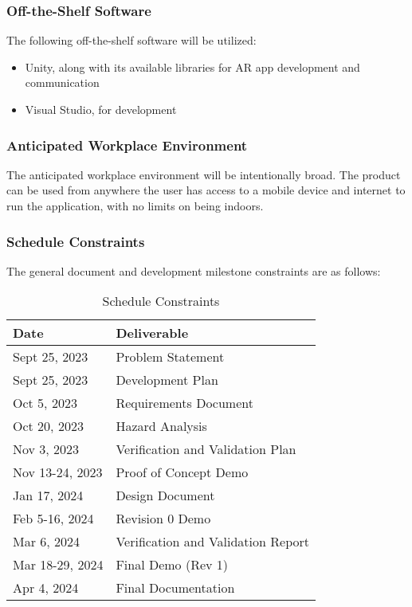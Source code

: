 \documentclass[12pt]{article}
\begin{document}
\subsubsection{Off-the-Shelf Software}
The following off-the-shelf software will be utilized:
\begin{itemize}
	\item Unity, along with its available libraries for AR app development and communication 
        \item Visual Studio, for development
\end{itemize}

\subsubsection{Anticipated Workplace Environment}
The anticipated workplace environment will be intentionally broad. The product can be used from anywhere the user has access to a mobile device and internet to run the application, with no limits on being indoors. 

\subsubsection{Schedule Constraints}
The general document and development milestone constraints are as follows:
\begin{table}[H]
	\centering
	\caption{Schedule Constraints}
	\vspace{5pt}
	\begin{tabular}{|p{}|p{}|}
		\hline
		\textbf{Date}   & \textbf{Deliverable}               \\
		\hline
		Sept 25, 2023    & Problem Statement \\
        \hline
		Sept 25, 2023    & Development Plan \\
        \hline
		Oct 5, 2023    & Requirements Document \\
        \hline
		Oct 20, 2023    & Hazard Analysis \\
		\hline
		Nov 3, 2023     & Verification and Validation Plan   \\
		\hline
		Nov 13-24, 2023 & Proof of Concept Demo              \\
		\hline
		Jan 17, 2024    & Design Document                    \\
		\hline
		Feb 5-16, 2024  & Revision 0 Demo                    \\
		\hline
		Mar 6, 2024     & Verification and Validation Report \\
		\hline
		Mar 18-29, 2024 & Final Demo (Rev 1)                 \\
		\hline
		Apr 4, 2024     & Final Documentation                \\
		\hline
	\end{tabular}
\end{table}
\end{document}
